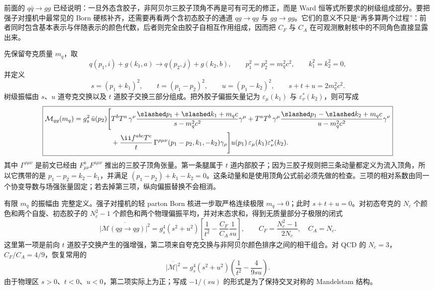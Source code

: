 
前面的 $q\bar q\to gg$ 已经说明：一旦外态含胶子，非阿贝尔三胶子顶角不再是可有可无的修正，而是 Ward 恒等式所要求的树级组成部分。要把强子对撞机中最常见的 Born 硬核补齐，还需要再看两个含初态胶子的通道 $qg\to qg$ 与 $gg\to gg$。它们的意义不只是“再多算两个过程”：前者同时包含基本表示与伴随表示的颜色代数，后者则完全由胶子自相互作用组成，因而把 $C_F$ 与 $C_A$ 在可观测散射核中的不同角色直接显露出来。

先保留夸克质量 $m_q$，取
\begin{equation*}
 q(p_1,i)+g(k_1,a)\to q(p_2,j)+g(k_2,b),
 \qquad
 p_1^2=p_2^2=m_q^2c^2,
 \qquad k_1^2=k_2^2=0,
\end{equation*}
并定义
\begin{equation*}
 s=(p_1+k_1)^2,
 \qquad
 t=(p_1-p_2)^2,
 \qquad
 u=(p_1-k_2)^2,
 \qquad s+t+u=2m_q^2c^2.
\end{equation*}
树级振幅由 $s$、$u$ 道夸克交换以及 $t$ 道胶子交换三部分组成。把外胶子偏振矢量记为 $\varepsilon_\mu(k_1)$ 与 $\varepsilon_\nu^*(k_2)$，则可写成
\begin{equation}
\boxed{
\begin{aligned}
\mathcal M_{qg}(m_q)
=g_s^2\,\bar u(p_2)\Bigg[&
 T^bT^a\,\gamma^\nu
 \frac{\slashed p_1+\slashed k_1+m_qc}{s-m_q^2c^2}\gamma^\mu
 +T^aT^b\,\gamma^\mu
 \frac{\slashed p_1-\slashed k_2+m_qc}{u-m_q^2c^2}\gamma^\nu\\
&+\frac{\ii f^{abc}T^c}{t}\,
 \Gamma^{\rho\mu\nu}(p_1-p_2,k_1,-k_2)\gamma_\rho
\Bigg]u(p_1)\,
\varepsilon_\mu(k_1)\varepsilon_\nu^*(k_2).
\end{aligned}}
\label{eq:qcd-qg-amplitude-dp94}
\end{equation}
其中 $\Gamma^{\rho\mu\nu}$ 是前文已经由 $F^a_{\mu\nu}F^{a\mu\nu}$ 推出的三胶子顶角张量。第一条腿属于 $t$ 道内部胶子；因为三胶子规则把三条动量都定义为流入顶角，所以它携带的是 $p_1-p_2=k_2-k_1$，并满足 $(p_1-p_2)+k_1-k_2=0$。这条动量和是使用顶角公式前必须先做的检查。三项的相对系数由同一个协变导数与场强张量固定；若去掉第三项，纵向偏振替换不会相消。

有限 $m_q$ 的振幅由 完整定义。强子对撞机的轻 parton Born 核进一步取严格连续极限 $m_q\to0$；此时 $s+t+u=0$。对初态夸克的 $N_c$ 个颜色和两个自旋、初态胶子的 $N_c^2-1$ 个颜色和两个物理偏振平均，并对末态求和，得到无质量部分子极限的闭式
\begin{equation}
\boxed{
\overline{|\mathcal M(qg\to qg)|^2}
=g_s^4(s^2+u^2)
\left[
 \frac1{t^2}-\frac{C_F}{C_A}\frac1{su}
\right],
\qquad
C_F=\frac{N_c^2-1}{2N_c},\quad C_A=N_c.}
\label{eq:qcd-qg-M2-dp94}
\end{equation}
这里第一项是前向 $t$ 道胶子交换产生的强增强，第二项来自夸克交换与非阿贝尔颜色排序之间的相干组合。对 QCD 的 $N_c=3$，$C_F/C_A=4/9$，恢复常用的
\begin{equation*}
 \overline{|\mathcal M|^2}
 =g_s^4(s^2+u^2)
 \left(\frac1{t^2}-\frac{4}{9su}\right).
\end{equation*}
由于物理区 $s>0$、$t<0$、$u<0$，第二项实际上为正；写成 $-1/(su)$ 的形式是为了保持交叉对称的 Mandelstam 结构。


